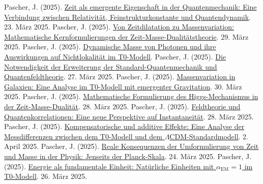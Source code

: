 \documentclass[a4paper,12pt]{article}
\newcommand{\alphaEM}{\alpha_{\text{EM}}}
\begin{document}
	\begin{thebibliography}{99}
		 Pascher, J. (2025). \href{https://github.com/jpascher/T0-Time-Mass-Duality/tree/main/2/pdf/Deutsch/NatEinheitenAlpha1.pdf}{Zeit als emergente Eigenschaft in der Quantenmechanik: Eine Verbindung zwischen Relativität, Feinstrukturkonstante und Quantendynamik}. 23. März 2025.
		 Pascher, J. (2025). \href{https://github.com/jpascher/T0-Time-Mass-Duality/tree/main/2/pdf/Deutsch/MathZeitMasseLagrange.pdf}{Von Zeitdilatation zu Massenvariation: Mathematische Kernformulierungen der Zeit-Masse-Dualitätstheorie}. 29. März 2025.
		 Pascher, J. (2025). \href{https://github.com/jpascher/T0-Time-Mass-Duality/tree/main/2/pdf/Deutsch/DynMassePhotonenNichtlokal.pdf}{Dynamische Masse von Photonen und ihre Auswirkungen auf Nichtlokalität im T0-Modell}.
		 Pascher, J. (2025). \href{https://github.com/jpascher/T0-Time-Mass-Duality/tree/main/2/pdf/Deutsch/NotwendigkeitQMErweiterung.pdf}{Die Notwendigkeit der Erweiterung der Standard-Quantenmechanik und Quantenfeldtheorie}. 27. März 2025.
		 Pascher, J. (2025). \href{https://github.com/jpascher/T0-Time-Mass-Duality/tree/main/2/pdf/Deutsch/MassVarGalaxien.pdf}{Massenvariation in Galaxien: Eine Analyse im T0-Modell mit emergenter Gravitation}. 30. März 2025.
		 Pascher, J. (2025). \href{https://github.com/jpascher/T0-Time-Mass-Duality/tree/main/2/pdf/Deutsch/MathHiggsZeitMasse.pdf}{Mathematische Formulierung des Higgs-Mechanismus in der Zeit-Masse-Dualität}. 28. März 2025.
		 Pascher, J. (2025). \href{https://github.com/jpascher/T0-Time-Mass-Duality/tree/main/2/pdf/Deutsch/FeldtheorieQuanten.pdf}{Feldtheorie und Quantenkorrelationen: Eine neue Perspektive auf Instantaneität}. 28. März 2025.
		 Pascher, J. (2025). \href{https://github.com/jpascher/T0-Time-Mass-Duality/tree/main/2/pdf/Deutsch/MessdifferenzenT0Standard.pdf}{Kompensatorische und additive Effekte: Eine Analyse der Messdifferenzen zwischen dem T0-Modell und dem \(\Lambda\)CDM-Standardmodell}. 2. April 2025.
		 Pascher, J. (2025). \href{https://github.com/jpascher/T0-Time-Mass-Duality/tree/main/2/pdf/Deutsch/JenseitsPlanck.pdf}{Reale Konsequenzen der Umformulierung von Zeit und Masse in der Physik: Jenseits der Planck-Skala}. 24. März 2025.
		 Pascher, J. (2025). \href{https://github.com/jpascher/T0-Time-Mass-Duality/tree/main/2/pdf/Deutsch/NatEinheitenAlpha1.pdf}{Energie als fundamentale Einheit: Natürliche Einheiten mit \(\alphaEM = 1\) im T0-Modell}. 26. März 2025.

\end{thebibliography}
\end{document}
